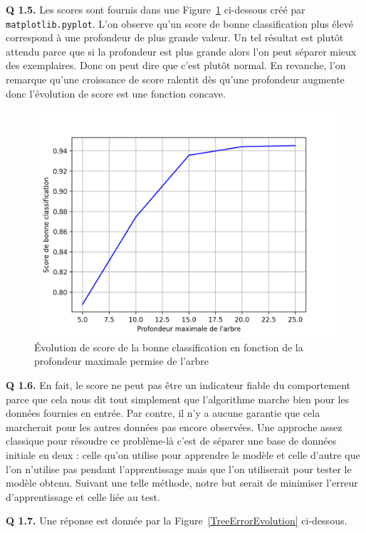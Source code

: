 \documentclass[a4paper,11pt]{article}
\theoremstyle{plain}
\theoremstyle{definition}
\begin{document}
\textbf{Q 1.5.} Les scores sont fournis dans une Figure~\ref{TreeScoreEvolution} ci-dessous créé par \texttt{matplotlib.pyplot}. L'on observe qu'un score de bonne classification plus élevé correspond à une profondeur de plus grande valeur. Un tel résultat est plutôt attendu parce que si la profondeur est plus grande alors l'on peut séparer mieux des exemplaires. Donc on peut dire que c'est plutôt normal. En revanche, l'on remarque qu'une croissance de score ralentit dès qu'une profondeur augmente donc l'évolution de score est une fonction concave.

\begin{figure}[ht]
\centering
\includegraphics{Figures/Figure_0.png}
\caption{Évolution de score de la bonne classification en fonction de la profondeur maximale permise de l'arbre}
\label{TreeScoreEvolution}
\end{figure}

\textbf{Q 1.6.} En fait, le score ne peut pas être un indicateur fiable du comportement parce que cela nous dit tout simplement que l'algorithme marche bien pour les données fournies en entrée. Par contre, il n'y a aucune garantie que cela marcherait pour les autres données pas encore observées. Une approche assez classique pour résoudre ce problème-là c'est de séparer une base de données initiale en deux : celle qu'on utilise pour apprendre le modèle et celle d'autre que l'on n'utilise pas pendant l'apprentissage mais que l'on utiliserait pour tester le modèle obtenu. Suivant une telle méthode, notre but serait de minimiser l'erreur d'apprentissage et celle liée au test.

\textbf{Q 1.7.} Une réponse est donnée par la Figure~\ref{TreeErrorEvolution} ci-dessous.
\end{document}
